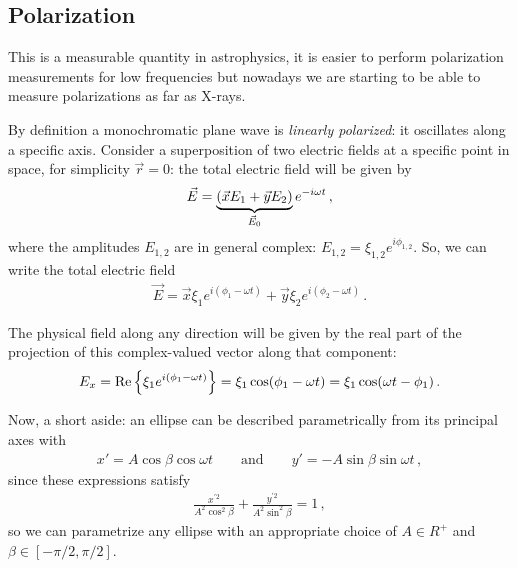 \documentclass[main.tex]{subfiles}
\begin{document}
\subsection{Polarization}

This is a measurable quantity in astrophysics, it is easier to perform polarization measurements for low frequencies but nowadays we are starting to be able to measure polarizations as far as X-rays. 

By definition a monochromatic plane wave is \emph{linearly polarized}: it oscillates along a specific axis. 
Consider a superposition of two electric fields at a specific point in space, for simplicity \(\vec{r} = 0 \): the total electric field will be given by 
%
\begin{align}
\vec{E} = \underbrace{\qty(\vec{x} E_1 + \vec{y} E_2 )}_{\vec{E}_0 } e^{-i \omega t}
\,,
\end{align}
%
where the amplitudes \(E_{1,2} \) are in general complex: \(E_{1, 2} = \xi_{1, 2} e^{i \phi_{1,2} }\). So, we can write the total electric field 
%
\begin{align}
\vec{E} = 
\vec{x} \xi_1 e^{i (\phi_1 - \omega t)}
+
\vec{y} \xi_2 e^{i (\phi_2 - \omega t)}
\,.
\end{align}

The physical field along any direction will be given by the real part of the projection of this complex-valued vector along that component: 
%
\begin{align}
E_x = \Re \qty{\xi_1 e^{i (\phi_1 - \omega t)}} = \xi_1 \cos(\phi_1 - \omega t)
= \xi_1 \cos(\omega t - \phi_1 )
\,.
\end{align}

Now, a short aside: an ellipse can be described parametrically from its principal axes with 
%
\begin{align}
x' = A \cos \beta \cos \omega t
\qquad \text{and} \qquad
y' = - A \sin \beta \sin \omega t
\,,
\end{align}
%
since these expressions satisfy 
%
\begin{align}
\frac{x^{\prime 2} }{A^2 \cos^2\beta }
+\frac{y^{\prime 2} }{A^2 \sin^2\beta }
= 1
\,,
\end{align}
%
so we can parametrize any ellipse with an appropriate choice of \(A \in R^{+}\) and \(\beta \in [- \pi /2, \pi /2]\). 
\end{document}
